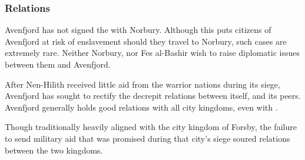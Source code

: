 \subsubsection{Relations}

Avenfjord has not signed the  with Norbury. Although
this puts citizens of Avenfjord at risk of enslavement should they travel to
Norbury, such cases are extremely rare. Neither Norbury, nor Fes al-Bashir wish
to raise diplomatic issues between them and Avenfjord.

After Nen-Hilith received little aid from the warrior nations during its siege,
Avenfjord has sought to rectify the decrepit relations between itself, and its
peers. Avenfjord generally holds good relations with all city kingdoms, even
with .

Though traditionally heavily aligned with the city kingdom of Forsby, the
failure to send military aid that was promised during that city's siege
soured relations between the two kingdoms.
